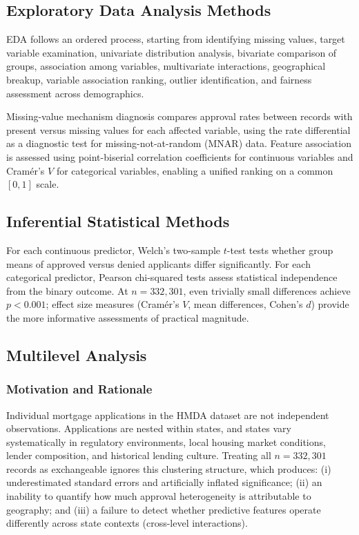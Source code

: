 \documentclass[12pt,letterpaper]{article}
\begin{document}
\subsection{Exploratory Data Analysis Methods}

EDA follows an ordered process, starting from identifying missing values, target variable examination,
univariate distribution analysis, bivariate comparison of groups, association among variables, multivariate interactions, geographical breakup, variable association ranking, outlier identification, and fairness assessment across demographics.

Missing-value mechanism diagnosis compares approval rates between records with present versus
missing values for each affected variable, using the rate differential as a diagnostic test for
missing-not-at-random (MNAR) data. Feature association is assessed using point-biserial
correlation coefficients for continuous variables and Cram\'{e}r's $V$ for categorical variables,
enabling a unified ranking on a common $[0,1]$ scale.

\subsection{Inferential Statistical Methods}

For each continuous predictor, Welch's two-sample $t$-test tests whether group means of approved
versus denied applicants differ significantly. For each categorical predictor, Pearson chi-squared
tests assess statistical independence from the binary outcome. At $n = 332{,}301$, even trivially
small differences achieve $p < 0.001$; effect size measures (Cram\'{e}r's $V$, mean differences,
Cohen's $d$) provide the more informative assessments of practical magnitude.

\subsection{Multilevel Analysis}
\label{sec:multilevel}

\subsubsection{Motivation and Rationale}
\label{sec:multilevel_motivation}

Individual mortgage applications in the HMDA dataset are not independent observations.
Applications are nested within states, and states vary systematically in regulatory environments,
local housing market conditions, lender composition, and historical lending culture.
Treating all $n = 332{,}301$ records as exchangeable ignores this clustering structure, which
produces: (i) underestimated standard errors and artificially inflated significance; (ii) an
inability to quantify how much approval heterogeneity is attributable to geography; and
(iii) a failure to detect whether predictive features operate differently across state contexts
(cross-level interactions).
\end{document}
